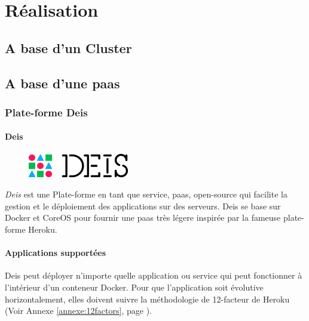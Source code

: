\chapter{Réalisation}
\begin{onehalfspace}

\newpage

\section{A base d'un Cluster}





\section{A base d'une \acrshort{paas}}

\subsection{Plate-forme Deis}

\subsubsection*{Deis}

\begin{figure}
\centering
\includegraphics[scale=0.4]{chapitre5/assets/deis}
\end{figure}
\noindent \emph{Deis} est une Plate-forme en tant que service, \acrshort{paas}, open-source qui facilite la gestion et le déploiement des applications sur des serveurs. Deis se base sur Docker et CoreOS pour fournir une \acrshort{paas} très légere inspirée par la fameuse plate-forme Heroku.


\subsubsection*{Applications supportées}

Deis peut déployer n'importe quelle application ou service qui peut fonctionner à l'intérieur d'un conteneur Docker. Pour que l'application soit évolutive horizontalement, elles doivent suivre la méthodologie de 12-facteur de Heroku (Voir Annexe \ref{annexe:12factors}, page \pageref{annexe:12factors}).


\end{onehalfspace}
